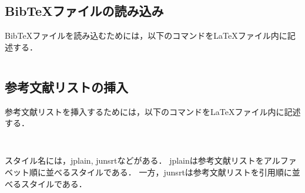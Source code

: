 \subsection{BibTeXファイルの読み込み}
BibTeXファイルを読み込むためには，以下のコマンドを\LaTeX ファイル内に記述する．
\begin{lstlisting}

\end{lstlisting}

\subsection{参考文献リストの挿入}
参考文献リストを挿入するためには，以下のコマンドを\LaTeX ファイル内に記述する．
\begin{lstlisting}


\end{lstlisting}
スタイル名には，jplain, junsrtなどがある．
jplainは参考文献リストをアルファベット順に並べるスタイルである．
一方，junsrtは参考文献リストを引用順に並べるスタイルである．
